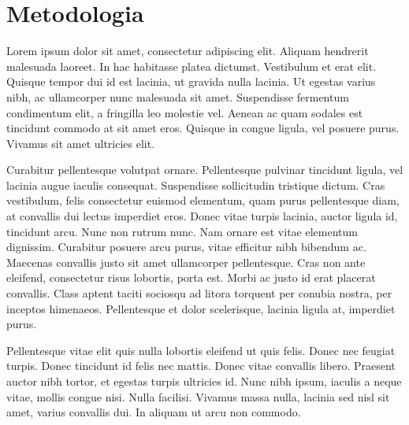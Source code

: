 \chapter{Metodologia}

Lorem ipsum dolor sit amet, consectetur adipiscing elit. Aliquam hendrerit malesuada laoreet. In hac habitasse platea dictumst. Vestibulum et erat elit. Quisque tempor dui id est lacinia, ut gravida nulla lacinia. Ut egestas varius nibh, ac ullamcorper nunc malesuada sit amet. Suspendisse fermentum condimentum elit, a fringilla leo molestie vel. Aenean ac quam sodales est tincidunt commodo at sit amet eros. Quisque in congue ligula, vel posuere purus. Vivamus sit amet ultricies elit.

Curabitur pellentesque volutpat ornare. Pellentesque pulvinar tincidunt ligula, vel lacinia augue iaculis consequat. Suspendisse sollicitudin tristique dictum. Cras vestibulum, felis consectetur euismod elementum, quam purus pellentesque diam, at convallis dui lectus imperdiet eros. Donec vitae turpis lacinia, auctor ligula id, tincidunt arcu. Nunc non rutrum nunc. Nam ornare est vitae elementum dignissim. Curabitur posuere arcu purus, vitae efficitur nibh bibendum ac. Maecenas convallis justo sit amet ullamcorper pellentesque. Cras non ante eleifend, consectetur risus lobortis, porta est. Morbi ac justo id erat placerat convallis. Class aptent taciti sociosqu ad litora torquent per conubia nostra, per inceptos himenaeos. Pellentesque et dolor scelerisque, lacinia ligula at, imperdiet purus.

Pellentesque vitae elit quis nulla lobortis eleifend ut quis felis. Donec nec feugiat turpis. Donec tincidunt id felis nec mattis. Donec vitae convallis libero. Praesent auctor nibh tortor, et egestas turpis ultricies id. Nunc nibh ipsum, iaculis a neque vitae, mollis congue nisi. Nulla facilisi. Vivamus massa nulla, lacinia sed nisl sit amet, varius convallis dui. In aliquam ut arcu non commodo.